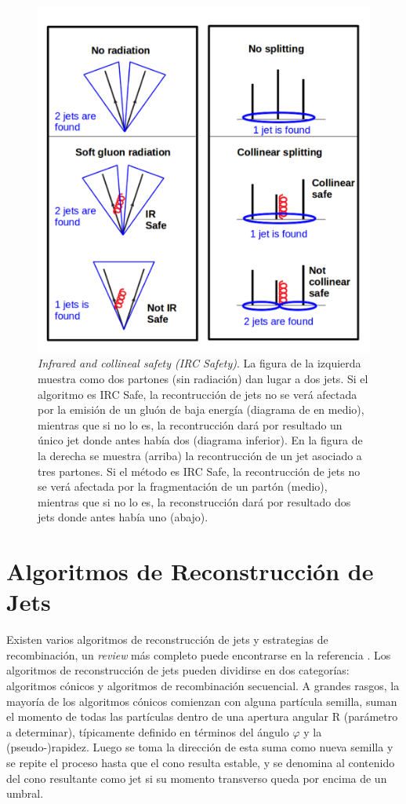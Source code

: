 \begin{figure}[h]
    \centering
    \includegraphics[width =0.6\linewidth]{images/IRC}
    \caption{\emph{Infrared and collineal safety (IRC Safety)}. La figura de la izquierda muestra como dos partones (sin radiación) dan lugar a dos jets. Si el algoritmo es IRC Safe, la recontrucción de jets no se verá afectada por la emisión de un gluón de baja energía (diagrama de en medio), mientras que si no lo es, la recontrucción dará por resultado un único jet donde antes había dos (diagrama inferior). En la figura de la derecha se muestra (arriba) la recontrucción de un jet asociado a tres partones. Si el método es IRC Safe, la recontrucción de jets no se verá afectada por la fragmentación de un partón (medio), mientras que si no lo es, la reconstrucción dará por resultado dos jets donde antes había uno (abajo).}
    \label{fig:IRC}
\end{figure}

\section{Algoritmos de Reconstrucción de Jets}\label{JetAlgo}
Existen varios algoritmos de reconstrucción de jets y estrategias de recombinación, un \emph{review} más completo puede encontrarse en la referencia \cite{Jetography}. Los algoritmos de reconstrucción de jets pueden dividirse en dos categorías: algoritmos cónicos y algoritmos de recombinación secuencial. A grandes rasgos, la mayoría de los algoritmos cónicos comienzan con alguna partícula semilla, suman el momento de todas las partículas dentro de una apertura angular R (parámetro a determinar), típicamente definido en términos del ángulo $\varphi$ y la (pseudo-)rapidez. Luego se toma la dirección de esta suma como nueva semilla y se repite el proceso hasta que el cono resulta estable, y se denomina al contenido del cono resultante como jet si su momento transverso queda por encima de un umbral. 

